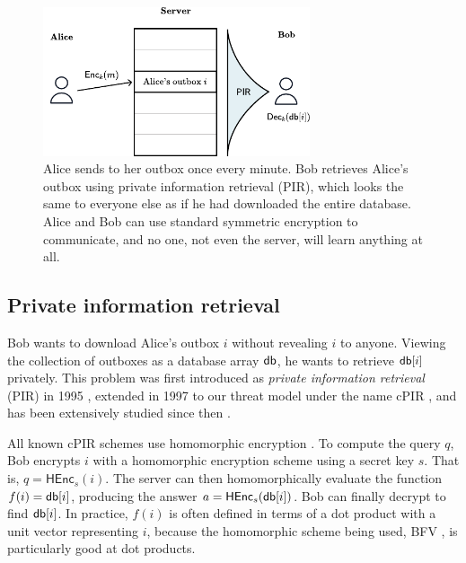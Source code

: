 \begin{figure}
    \centering
    \includegraphics[width=0.7\textwidth]{pirfigure.pdf}
\caption{Alice sends to her outbox once every minute. Bob retrieves Alice's outbox using private information retrieval (PIR), which looks the same to everyone else as if he had downloaded the entire database. Alice and Bob can use standard symmetric encryption to communicate, and no one, not even the server, will learn anything at all.}
\label{fig:highlevelpir}
\end{figure}



\subsection{Private information retrieval}

Bob wants to download Alice's outbox $i$ without revealing $i$ to anyone. Viewing the collection of outboxes as a database array $\mathsf{db}$, he wants to retrieve $\mathsf{db}[i]$ privately. This problem was first introduced as \textit{private information retrieval} (PIR) in 1995 \cite{chor1995private}, extended in 1997 to our threat model under the name cPIR \cite{kushilevitz1997replication}, and has been extensively studied since then \cite{melchor2016xpir,angel2018pir, ahmad2021addra}.

All known cPIR schemes use homomorphic encryption \cite{gentry2010computing}. To compute the query $q$, Bob encrypts $i$ with a homomorphic encryption scheme using a secret key $s$. That is, $q = \mathsf{HEnc}_s(i)$. The server can then homomorphically evaluate the function $f(i) = \mathsf{db}[i]$, producing the answer $a = \mathsf{HEnc}_s(\mathsf{db}[i])$. Bob can finally decrypt to find $\mathsf{db}[i]$. In practice, $f(i)$ is often defined in terms of a dot product with a unit vector representing $i$, because the homomorphic scheme being used, BFV \cite{fan2012somewhat}, is particularly good at dot products.

